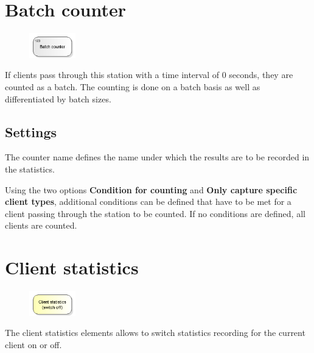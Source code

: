 \section{Batch counter}
\label{ref:ModelElementCounterBatch}

\begin{figure}
\vspace{-22pt}
\includegraphics[width=2cm]{imageModelElementCounterBatch.png}
\vspace{-22pt}
\end{figure}

If clients pass through this station with a time interval of 0 seconds, they are counted as a batch.
The counting is done on a batch basis as well as differentiated by batch sizes.

\subsection*{Settings}

The counter name defines the name under which the results are to be recorded in the statistics.

Using the two options \textbf{Condition for counting} and \textbf{Only capture specific client types},
additional conditions can be defined that have to be met for a client passing through the station to be counted.
If no conditions are defined, all clients are counted.


\section{Client statistics}
\label{ref:ModelElementSetStatisticsMode}

\begin{figure}
\vspace{-22pt}
\includegraphics[width=2cm]{imageModelElementSetStatisticsMode.png}
\vspace{-22pt}
\end{figure}

The client statistics elements allows to switch statistics recording
for the current client on or off.

